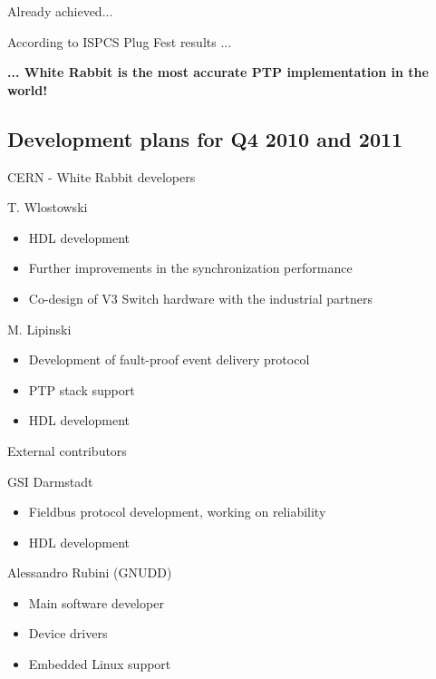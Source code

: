 \documentclass[xcolor=dvipsnames]{beamer}
\begin{document}
\begin{frame}{Already achieved...}
  \begin{block}{According to ISPCS Plug Fest results ...}
    \begin{center}
      \textbf{... White Rabbit is the most accurate PTP implementation in the world!}
  \end{center}
  \end{block}
\end{frame}

\subsection{Development plans for Q4 2010 and 2011}

\begin{frame}{CERN - White Rabbit developers}
  \begin{block}{T. Wlostowski}
    \begin{itemize} 
      \item HDL development 
      \item Further improvements in the synchronization performance
      \item Co-design of V3 Switch hardware with the industrial partners
      \end{itemize}
    \end{block}
  \begin{block}{M. Lipinski}
    \begin{itemize} 
      \item Development of fault-proof event delivery protocol
      \item PTP stack support
      \item HDL development
      \end{itemize}
    \end{block}
\end{frame}

\begin{frame}{External contributors}

  \begin{block}{GSI Darmstadt}
    \begin{itemize} 
    \item Fieldbus protocol development, working on reliability
    \item HDL development
      \end{itemize}
    \end{block}
  \begin{block}{Alessandro Rubini (GNUDD)}
    \begin{itemize} 
      \item Main software developer
      \item Device drivers
      \item Embedded Linux support
      \end{itemize}
    \end{block}
\end{frame}
\end{document}
